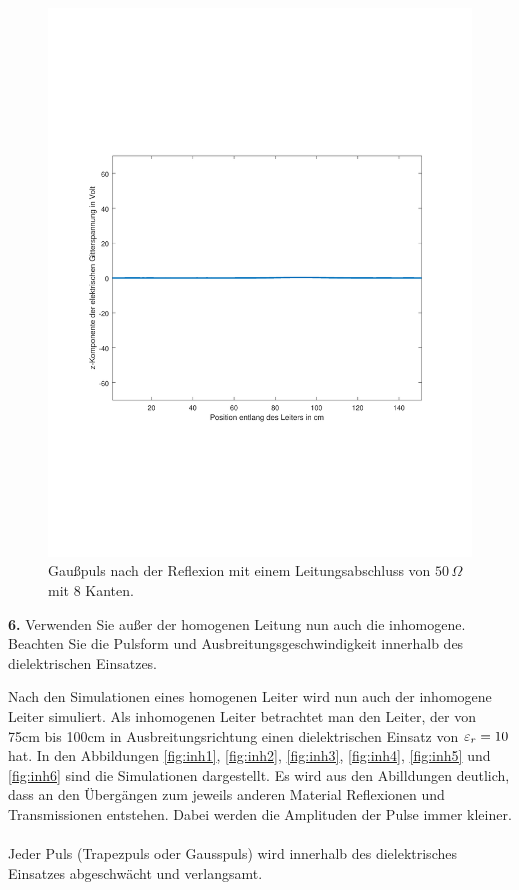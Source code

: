\documentclass[Protokollheft.tex]{subfiles}
\begin{document}
\begin{figure}[ht]
	\centering
	\includegraphics[trim = 20mm 65mm 20mm 65mm, clip,width=0.7\linewidth]{untitled6.pdf}
	\caption{Gaußpuls nach der Reflexion mit einem Leitungsabschluss von $50\,\Omega$ mit 8 Kanten.}\label{fig:gauss6}
\end{figure}


\begin{framed}
	\noindent \textbf{6.} Verwenden Sie außer der homogenen Leitung nun auch die
inhomogene. Beachten Sie die Pulsform und
Ausbreitungsgeschwindigkeit innerhalb des dielektrischen
Einsatzes.\label{exer:inhomogenTLine}
\end{framed}
\noindent
Nach den Simulationen eines homogenen Leiter wird nun auch der inhomogene Leiter simuliert. Als inhomogenen Leiter betrachtet man den Leiter, der von 75cm bis 100cm in Ausbreitungsrichtung einen dielektrischen Einsatz von $\varepsilon_r=10$ hat. In den Abbildungen \ref{fig:inh1}, \ref{fig:inh2}, \ref{fig:inh3}, \ref{fig:inh4}, \ref{fig:inh5} und \ref{fig:inh6} sind die Simulationen dargestellt. Es wird aus den Abilldungen deutlich, dass an den Übergängen zum jeweils anderen Material Reflexionen und Transmissionen entstehen. Dabei werden die Amplituden der Pulse immer kleiner.\\ \\
Jeder Puls (Trapezpuls oder Gausspuls) wird innerhalb des dielektrisches Einsatzes abgeschwächt und verlangsamt.
\end{document}
